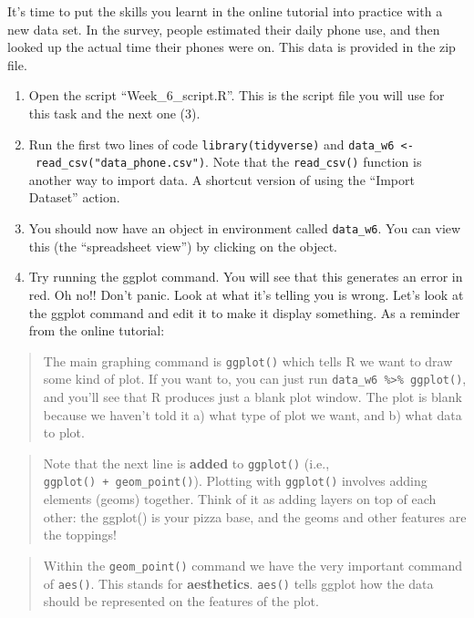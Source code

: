 \documentclass[
]{book}
\begin{document}
It's time to put the skills you learnt in the online tutorial into practice with a new data set. In the survey, people estimated their daily phone use, and then looked up the actual time their phones were on. This data is provided in the zip file.

\begin{enumerate}
\def\labelenumi{\arabic{enumi}.}
\item
  Open the script ``Week\_6\_script.R''. This is the script file you will use for this task and the next one (3).
\item
  Run the first two lines of code \texttt{library(tidyverse)} and \texttt{data\_w6\ \textless{}-\ read\_csv("data\_phone.csv")}. Note that the \texttt{read\_csv()} function is another way to import data. A shortcut version of using the ``Import Dataset'' action.
\item
  You should now have an object in environment called \texttt{data\_w6}. You can view this (the ``spreadsheet view'') by clicking on the object.
\item
  Try running the ggplot command. You will see that this generates an error in red. Oh no!! Don't panic. Look at what it's telling you is wrong. Let's look at the ggplot command and edit it to make it display something. As a reminder from the online tutorial:
\end{enumerate}

\begin{quote}
The main graphing command is \texttt{ggplot()} which tells R we want to draw some kind of plot. If you want to, you can just run \texttt{data\_w6\ \%\textgreater{}\%\ ggplot()}, and you'll see that R produces just a blank plot window. The plot is blank because we haven't told it a) what type of plot we want, and b) what data to plot.
\end{quote}

\begin{quote}
Note that the next line is \textbf{added} to \texttt{ggplot()} (i.e., \texttt{ggplot()\ +\ geom\_point()}). Plotting with \texttt{ggplot()} involves adding elements (geoms) together. Think of it as adding layers on top of each other: the ggplot() is your pizza base, and the geoms and other features are the toppings!
\end{quote}

\begin{quote}
Within the \texttt{geom\_point()} command we have the very important command of \texttt{aes()}. This stands for \textbf{aesthetics}. \texttt{aes()} tells ggplot how the data should be represented on the features of the plot.
\end{quote}
\end{document}
